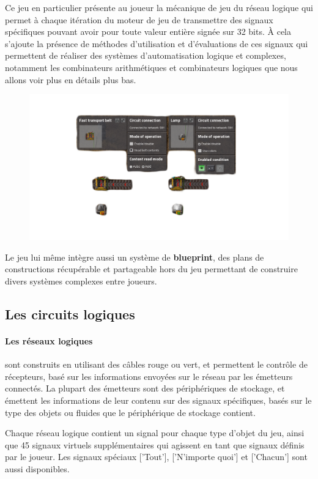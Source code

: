 Ce jeu en particulier présente au joueur la mécanique de jeu du réseau logique qui permet à chaque itération du moteur de jeu de transmettre des signaux spécifiques pouvant avoir pour toute valeur entière signée sur 32 bits.
À cela s'ajoute la présence de méthodes d'utilisation et d'évaluations de ces signaux qui permettent de réaliser des systèmes d'automatisation logique et complexes, notamment les combinateurs arithmétiques et combinateurs logiques que nous allons voir plus en détails plus bas.


\begin{figure}[h]
\centering
\includegraphics[width=0.8\linewidth]{pics/factorio-logic-basis.png}

\end{figure}

Le jeu lui même intègre aussi un système de \textbf{blueprint}, des plans de constructions récupérable et partageable hors du jeu permettant de construire divers systèmes complexes entre joueurs.


\subsection{Les circuits logiques}

\paragraph{Les réseaux logiques} 
sont construits en utilisant des câbles rouge ou vert, et permettent le contrôle de récepteurs, basé sur les informations envoyées sur le réseau par les émetteurs connectés. 
La plupart des émetteurs sont des périphériques de stockage, et émettent les informations de leur contenu sur des signaux spécifiques, basés sur le type des objets ou fluides que le périphérique de stockage contient. 

Chaque réseau logique contient un signal pour chaque type d'objet du jeu, ainsi que 45 signaux virtuels supplémentaires qui agissent en tant que signaux définis par le joueur. 
Les signaux spéciaux ['Tout'], ['N'importe quoi'] et ['Chacun'] sont aussi disponibles.

